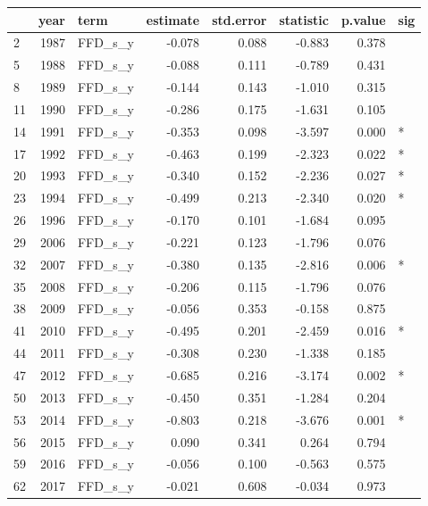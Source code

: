 \documentclass[
]{article}
\newenvironment{Shaded}{\begin{snugshade}}{\end{snugshade}}
\newcommand{\CommentTok}[1]{\textcolor[rgb]{0.56,0.35,0.01}{\textit{#1}}}
\newcommand{\DataTypeTok}[1]{\textcolor[rgb]{0.13,0.29,0.53}{#1}}
\newcommand{\DecValTok}[1]{\textcolor[rgb]{0.00,0.00,0.81}{#1}}
\newcommand{\FloatTok}[1]{\textcolor[rgb]{0.00,0.00,0.81}{#1}}
\newcommand{\KeywordTok}[1]{\textcolor[rgb]{0.13,0.29,0.53}{\textbf{#1}}}
\newcommand{\NormalTok}[1]{#1}
\newcommand{\OperatorTok}[1]{\textcolor[rgb]{0.81,0.36,0.00}{\textbf{#1}}}
\newcommand{\StringTok}[1]{\textcolor[rgb]{0.31,0.60,0.02}{#1}}
\begin{document}
\begin{Shaded}
\end{Shaded}

\begin{longtable}[]{@{}lrlrrrrl@{}}
\toprule
& year & term & estimate & std.error & statistic & p.value &
sig\tabularnewline
\midrule
\endhead
2 & 1987 & FFD\_s\_y & -0.078 & 0.088 & -0.883 & 0.378 &\tabularnewline
5 & 1988 & FFD\_s\_y & -0.088 & 0.111 & -0.789 & 0.431 &\tabularnewline
8 & 1989 & FFD\_s\_y & -0.144 & 0.143 & -1.010 & 0.315 &\tabularnewline
11 & 1990 & FFD\_s\_y & -0.286 & 0.175 & -1.631 & 0.105 &\tabularnewline
14 & 1991 & FFD\_s\_y & -0.353 & 0.098 & -3.597 & 0.000 &
*\tabularnewline
17 & 1992 & FFD\_s\_y & -0.463 & 0.199 & -2.323 & 0.022 &
*\tabularnewline
20 & 1993 & FFD\_s\_y & -0.340 & 0.152 & -2.236 & 0.027 &
*\tabularnewline
23 & 1994 & FFD\_s\_y & -0.499 & 0.213 & -2.340 & 0.020 &
*\tabularnewline
26 & 1996 & FFD\_s\_y & -0.170 & 0.101 & -1.684 & 0.095 &\tabularnewline
29 & 2006 & FFD\_s\_y & -0.221 & 0.123 & -1.796 & 0.076 &\tabularnewline
32 & 2007 & FFD\_s\_y & -0.380 & 0.135 & -2.816 & 0.006 &
*\tabularnewline
35 & 2008 & FFD\_s\_y & -0.206 & 0.115 & -1.796 & 0.076 &\tabularnewline
38 & 2009 & FFD\_s\_y & -0.056 & 0.353 & -0.158 & 0.875 &\tabularnewline
41 & 2010 & FFD\_s\_y & -0.495 & 0.201 & -2.459 & 0.016 &
*\tabularnewline
44 & 2011 & FFD\_s\_y & -0.308 & 0.230 & -1.338 & 0.185 &\tabularnewline
47 & 2012 & FFD\_s\_y & -0.685 & 0.216 & -3.174 & 0.002 &
*\tabularnewline
50 & 2013 & FFD\_s\_y & -0.450 & 0.351 & -1.284 & 0.204 &\tabularnewline
53 & 2014 & FFD\_s\_y & -0.803 & 0.218 & -3.676 & 0.001 &
*\tabularnewline
56 & 2015 & FFD\_s\_y & 0.090 & 0.341 & 0.264 & 0.794 &\tabularnewline
59 & 2016 & FFD\_s\_y & -0.056 & 0.100 & -0.563 & 0.575 &\tabularnewline
62 & 2017 & FFD\_s\_y & -0.021 & 0.608 & -0.034 & 0.973 &\tabularnewline
\bottomrule
\end{longtable}
\end{document}
